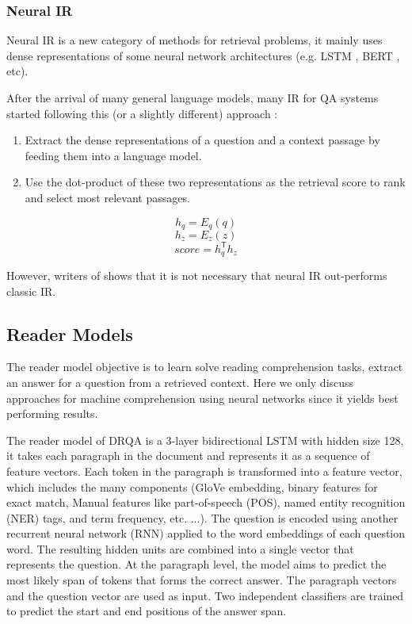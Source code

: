 \documentclass[a4paper,12pt]{article}
\begin{document}
\subsubsection{Neural IR}
Neural IR is a new category of methods for retrieval problems, it mainly uses dense representations of some neural network architectures (e.g. LSTM \cite{lstm}, BERT \cite{bert}, etc). 

After the arrival of many general language models, many IR for QA systems started following this (or a slightly different) approach :
\begin{enumerate}
	\item Extract the dense representations of a question and a context passage by feeding them into a language model.
	\item Use the dot-product of these two representations as the retrieval score to rank and select most relevant passages.
\end{enumerate}

$$h_q=E_q(q)$$ 
$$h_z=E_z(z)$$
$$score=h_q^\mathsf{T} h_z$$

However, writers of \cite{lin} shows that it is not necessary that neural IR out-performs classic IR.

\subsection{Reader Models}
The reader model objective is to learn solve reading comprehension tasks, extract an answer for a question from a retrieved context. 
Here we only discuss approaches for machine comprehension using neural networks since it yields best performing results.

The reader model of DRQA \cite{drqa} is a 3-layer bidirectional LSTM with hidden size 128, it takes each paragraph in the document and represents it as a sequence of feature vectors. 
Each token in the paragraph is transformed into a feature vector, which includes the many components (GloVe \cite{glove} embedding, binary features for exact match, Manual features like part-of-speech (POS), named entity recognition (NER) tags, and term frequency, etc. ...).
The question is encoded using another recurrent neural network (RNN) applied to the word embeddings of each question word. The resulting hidden units are combined into a single vector that represents the question. At the paragraph level, the model aims to predict the most likely span of tokens that forms the correct answer. The paragraph vectors and the question vector are used as input. 
Two independent classifiers are trained to predict the start and end positions of the answer span.
\end{document}

